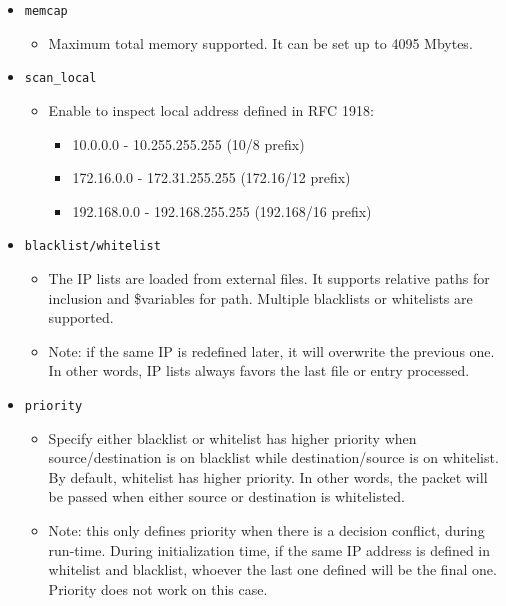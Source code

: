 \documentclass[english]{report}
\begin{document}
\begin{itemize}

\item[] \texttt{memcap}
\begin{itemize}
\item[]   Maximum total memory supported. It can be set up to 4095 Mbytes.
\end{itemize}

\item[] \texttt{scan\_local}
\begin{itemize}
\item[]   Enable to inspect local address defined in RFC 1918:
\begin{itemize}
         \item[]  10.0.0.0        -   10.255.255.255  (10/8 prefix)
         \item[]  172.16.0.0      -   172.31.255.255  (172.16/12 prefix)
         \item[]  192.168.0.0     -   192.168.255.255 (192.168/16 prefix)
\end{itemize}
\end{itemize}

\item[] \texttt{blacklist/whitelist}
\begin{itemize}
\item[]    The IP lists are loaded from external files. It supports relative 
           paths for inclusion and \$variables for path. Multiple blacklists or 
           whitelists are supported.
          
 \item[]   Note: if the same IP is redefined later, it will overwrite the 
           previous one. In other words, IP lists always favors the last file or
           entry processed.
\end{itemize}

\item[] \texttt{priority}
\begin{itemize}
\item[]   Specify either blacklist or whitelist has higher priority when 
           source/destination is on blacklist while destination/source is on 
           whitelist. By default, whitelist has higher priority. In other words,
           the packet will be passed when either source or destination is 
           whitelisted.
           
\item[]    Note: this only defines priority when there is a decision conflict, 
           during run-time. During initialization time, if the same IP address 
           is defined in whitelist and blacklist, whoever the last one defined 
           will be the final one. Priority does not work on this case.
\end{itemize}


\end{itemize}
\end{document}
